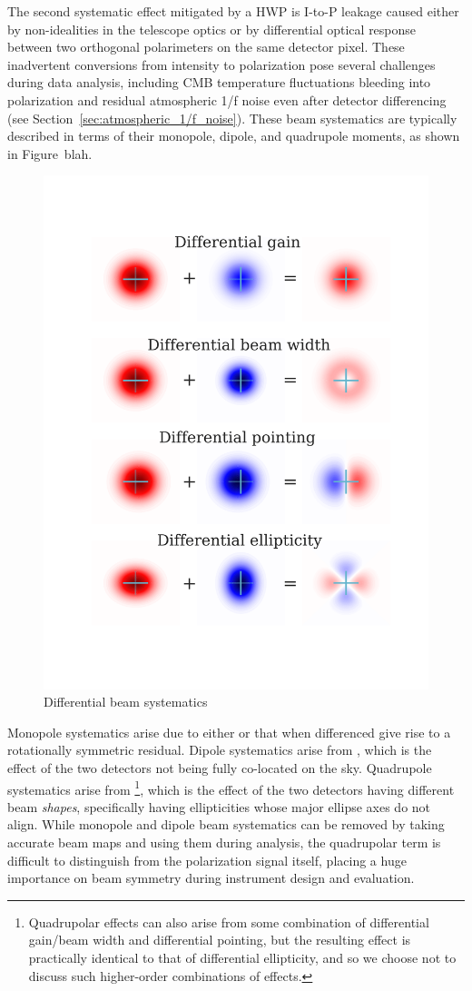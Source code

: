 The second systematic effect mitigated by a HWP is I-to-P leakage caused either by non-idealities in the telescope optics or by differential optical response between two orthogonal polarimeters on the same detector pixel. These inadvertent conversions from intensity to polarization pose several challenges during data analysis, including CMB temperature fluctuations bleeding into polarization and residual atmospheric 1/f noise even after detector differencing (see Section~\ref{sec:atmospheric_1/f_noise}). These beam systematics are typically described in terms of their monopole, dipole, and quadrupole moments, as shown in Figure~blah.

\begin{figure}[!t]
    \centering
    \includegraphics[width=0.7\linewidth, trim=9.5cm 11cm 7.5cm 9cm, clip]{PolarizationModulation/Figures/beam_systematics.pdf}
    \caption{Differential beam systematics}
    \label{fig:beam_systematics}
\end{figure}

Monopole systematics arise due to either  or  that when differenced give rise to a rotationally symmetric residual. Dipole systematics arise from , which is the effect of the two detectors not being fully co-located on the sky. Quadrupole systematics arise from \footnote{Quadrupolar effects can also arise from some combination of differential gain/beam width and differential pointing, but the resulting effect is practically identical to that of differential ellipticity, and so we choose not to discuss such higher-order combinations of effects.}, which is the effect of the two detectors having different beam \textit{shapes}, specifically having ellipticities whose major ellipse axes do not align. While monopole and dipole beam systematics can be removed by taking accurate beam maps and using them during analysis, the quadrupolar term is difficult to distinguish from the polarization signal itself, placing a huge importance on beam symmetry during instrument design and evaluation.

